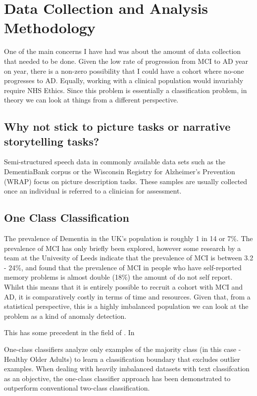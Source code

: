 \documentclass[11pt]{article}
\begin{document}
\section{Data Collection and Analysis Methodology}
One of the main concerns I have had was about the amount of data collection that needed to be done. Given the low rate of progression from MCI to AD year on year, there is a non-zero possibility that I could have a cohort where no-one progresses to AD. Equally, working with a clinical population would invariably require NHS Ethics. Since this problem is essentially a classification problem, in theory we can look at things from a different perspective. 

\subsection{Why not stick to picture tasks or narrative storytelling tasks?}
Semi-structured speech data in commonly available data sets such as the DementiaBank corpus or the Wisconsin Registry for Alzheimer's Prevention (WRAP) focus on picture description tasks. These samples are usually collected once an individual is referred to a clinician for assessment. 

\subsection{One Class Classification}
The prevalence of Dementia in the UK's population is roughly 1 in 14 or 7\%. The prevalence of MCI has only briefly been explored, however some research by a team at the Univesity of Leeds indicate that the prevalence of MCI is between 3.2 - 24\%, and found that the prevalence of MCI in people who have self-reported memory problems is almost double (18\%) the amount of do not self report. Whilst this means that it is entirely possible to recruit a cohort with MCI and AD, it is comparatively costly in terms of time and resources. Given that, from a statistical perspective, this is a highly imbalanced population we can look at the problem as a kind of anomaly detection.
\par 
This has some precedent in the field of . In 
\par 
One-class classifiers analyze only examples of the majority class (in this case - Healthy Older Adults) to learn a classification boundary that excludes outlier examples. When dealing with heavily imbalanced datasets with text classifcation as an objective, the one-class classifier approach has been demonstrated to outperform conventional two-class classification.  
\end{document}
